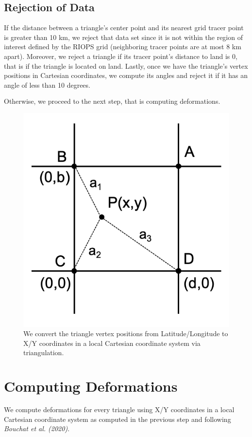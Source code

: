 \documentclass[draft]{agujournal2018}
\begin{document}
\subsection{Rejection of Data}

If the distance between a triangle's center point and its nearest grid tracer point is greater than 10 km, we reject that data set since it is not within the region of interest defined by the RIOPS grid (neighboring tracer points are at most 8 km apart). Moreover, we reject a triangle if its tracer point's distance to land is 0, that is if the triangle is located on land. Lastly, once we have the triangle's vertex positions in Cartesian coordinates, we compute its angles and reject it if it has an angle of less than 10 degrees. 

Otherwise, we proceed to the next step, that is computing deformations.

\begin{figure}[h]
 \begin{center}
   \includegraphics[scale=.6]{figures/triangulation.png}
 \end{center}
 \caption{ We convert the triangle vertex positions from Latitude/Longitude to X/Y coordinates in a local Cartesian coordinate system via triangulation.}
 \label{triangulation}
\end{figure}

\section{Computing Deformations}

We compute deformations for every triangle using X/Y coordinates in a local Cartesian coordinate system as computed in the previous step and following \textit{Bouchat et al. (2020)}.
\end{document}
